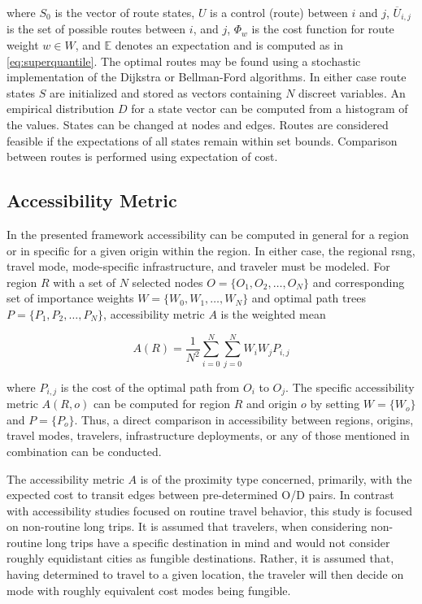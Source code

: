 \documentclass[11pt]{article}
\begin{document}
\begin{multicols}{2}
where $S_0$ is the vector of route states, $U$ is a control (route) between $i$ and $j$, $\overline{U}_{i,j}$ is the set of possible routes between $i$, and $j$, $\Phi_w$ is the cost function for route weight $w \in W$, and $\mathbb{E}$ denotes an expectation and is computed as in \eqref{eq:superquantile}. The optimal routes may be found using a stochastic implementation of the Dijkstra or Bellman-Ford algorithms. In either case route states $S$ are initialized and stored as vectors containing $N$ discreet variables. An empirical distribution $D$ for a state vector can be computed from a histogram of the values. States can be changed at nodes and edges. Routes are considered feasible if the expectations of all states remain within set bounds. Comparison between routes is performed using expectation of cost.

\subsection*{Accessibility Metric}

In the presented framework accessibility can be computed in general for a region or in specific for a given origin within the region. In either case, the regional \gls{rsng}, travel mode, mode-specific infrastructure, and traveler must be modeled. For region $R$ with a set of $N$ selected nodes $O = \{O_1, O_2, \dots, O_N\}$ and corresponding set of importance weights $W = \{W_0, W_1, \dots, W_N\}$ and optimal path trees $P = \{P_1, P_2, \dots, P_N\}$, accessibility metric $A$ is the weighted mean

\begin{equation}
	A(R) = \frac{1}{N^2}\sum_{i = 0}^{N} \sum_{j = 0 }^{N} W_iW_jP_{i,j} \label{eq:a}
\end{equation}

where $P_{i,j}$ is the cost of the optimal path from $O_i$ to $O_j$. The specific accessibility metric $A(R, o)$ can be computed for region $R$ and origin $o$ by setting $W = \{W_o\}$ and $P = \{P_o\}$. Thus, a direct comparison in accessibility between regions, origins, travel modes, travelers, infrastructure deployments, or any of those mentioned in combination can be conducted.

The accessibility metric $A$ is of the proximity type concerned, primarily, with the expected cost to transit edges between pre-determined O/D pairs. In contrast with accessibility studies focused on routine travel behavior, this study is focused on non-routine long trips. It is assumed that travelers, when considering non-routine long trips have a specific destination in mind and would not consider roughly equidistant cities as fungible destinations. Rather, it is assumed that, having determined to travel to a given location, the traveler will then decide on mode with roughly equivalent cost modes being fungible.


\end{multicols}
\end{document}
